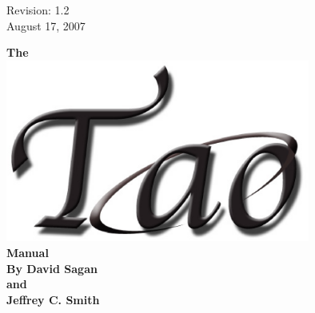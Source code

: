 \thispagestyle{empty}

\begin{flushright}
\large
  Revision: 1.2 \\
  August 17, 2007 \\
\end{flushright}

\vfill

{
\begin{center}
{\Huge \sf\bf The} \\
\vskip 0.1in
\includegraphics[width=10cm]{tao.eps} \\
\vskip 0.1in
{\Huge \sf\bf Manual} \\
\vskip 0.4in
{\Large \sf\bf By David Sagan \\ and \\ Jeffrey C. Smith} \\
\end{center}
}

\vfill
\break
